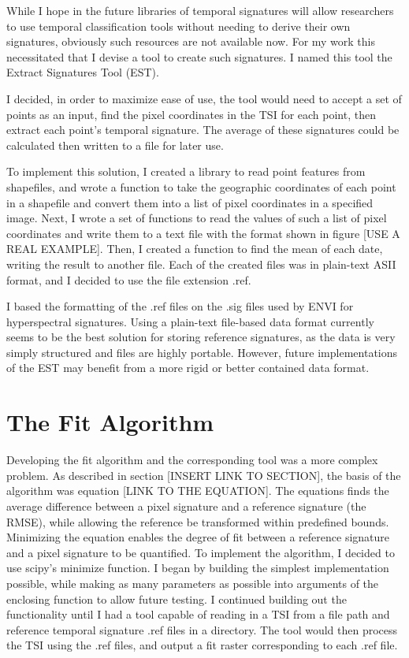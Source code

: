 While I hope in the future libraries of temporal signatures will allow researchers to use temporal classification tools without needing to derive their own signatures, obviously such resources are not available now. For my work this necessitated that I devise a tool to create such signatures. I named this tool the Extract Signatures Tool (EST).

I decided, in order to maximize ease of use, the tool would need to accept a set of points as an input, find the pixel coordinates in the TSI for each point, then extract each point’s temporal signature. The average of these signatures could be calculated then written to a file for later use.

To implement this solution, I created a library to read point features from shapefiles, and wrote a function to take the geographic coordinates of each point in a shapefile and convert them into a list of pixel coordinates in a specified image. Next, I wrote a set of functions to read the values of such a list of pixel coordinates and write them to a text file with the format shown in figure [USE A REAL EXAMPLE]. Then, I created a function to find the mean of each date, writing the result to another file. Each of the created files was in plain-text ASII format, and I decided to use the file extension .ref.

I based the formatting of the .ref files on the .sig files used by ENVI for hyperspectral signatures. Using a plain-text file-based data format currently seems to be the best solution for storing reference signatures, as the data is very simply structured and files are highly portable. However, future implementations of the EST may benefit from a more rigid or better contained data format.

\section{The Fit Algorithm}

Developing the fit algorithm and the corresponding tool was a more complex problem. As described in section [INSERT LINK TO SECTION], the basis of the algorithm was equation [LINK TO THE EQUATION]. The equations finds the average difference between a pixel signature and a reference signature (the RMSE), while allowing the reference be transformed within predefined bounds. Minimizing the equation enables the degree of fit between a reference signature and a pixel signature to be quantified. To implement the algorithm, I decided to use scipy’s minimize function. I began by building the simplest implementation possible, while making as many parameters as possible into arguments of the enclosing function to allow future testing. I continued building out the functionality until I had a tool capable of reading in a TSI from a file path and reference temporal signature .ref files in a directory. The tool would then process the TSI using the .ref files, and output a fit raster corresponding to each .ref file.

